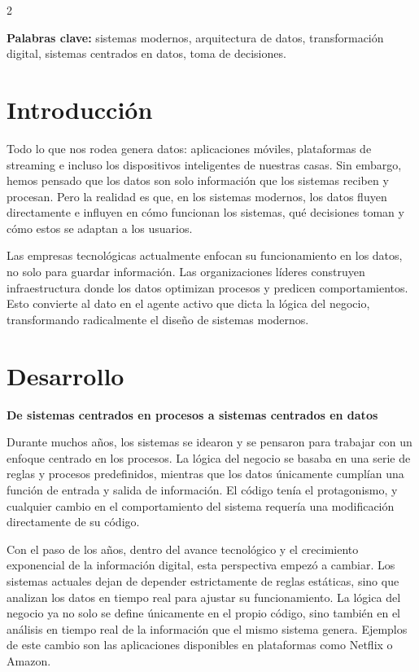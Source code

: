 \documentclass[10pt,spanish,Letterpaper,openany]{book}
\let\origtextbf\textbf
\renewcommand{\textbf}[1]{{\color{textlinetitle}\origtextbf{#1}}}
\begin{document}
\begin {multicols}{2}

\textbf{Palabras clave:} sistemas modernos, arquitectura de datos, transformación digital, sistemas centrados en datos, toma de decisiones.

\section{Introducción}\label{introducciuxf3n-10}

Todo lo que nos rodea genera datos: aplicaciones móviles, plataformas de streaming e incluso los dispositivos inteligentes de nuestras casas. Sin embargo, hemos pensado que los datos son solo información que los sistemas reciben y procesan. Pero la realidad es que, en los sistemas modernos, los datos fluyen directamente e influyen en cómo funcionan los sistemas, qué decisiones toman y cómo estos se adaptan a los usuarios.

Las empresas tecnológicas actualmente enfocan su funcionamiento en los datos, no solo para guardar información. Las organizaciones líderes construyen infraestructura donde los datos optimizan procesos y predicen comportamientos. Esto convierte al dato en el agente activo que dicta la lógica del negocio, transformando radicalmente el diseño de sistemas modernos.

\section{Desarrollo}\label{desarrollo-3}

\textbf{De sistemas centrados en procesos a sistemas centrados en datos}

Durante muchos años, los sistemas se idearon y se pensaron para trabajar con un enfoque centrado en los procesos. La lógica del negocio se basaba en una serie de reglas y procesos predefinidos, mientras que los datos únicamente cumplían una función de entrada y salida de información. El código tenía el protagonismo, y cualquier cambio en el comportamiento del sistema requería una modificación directamente de su código.

Con el paso de los años, dentro del avance tecnológico y el crecimiento exponencial de la información digital, esta perspectiva empezó a cambiar. Los sistemas actuales dejan de depender estrictamente de reglas estáticas, sino que analizan los datos en tiempo real para ajustar su funcionamiento. La lógica del negocio ya no solo se define únicamente en el propio código, sino también en el análisis en tiempo real de la información que el mismo sistema genera. Ejemplos de este cambio son las aplicaciones disponibles en plataformas como Netflix o Amazon.


\end{multicols}
\end{document}
